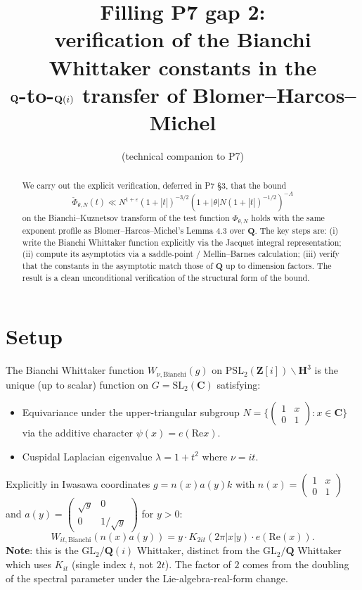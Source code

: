 \documentclass[11pt]{article}
\title{Filling P7 gap 2:\\
verification of the Bianchi Whittaker constants in the\\
$\Q$-to-$\Q(i)$ transfer of Blomer--Harcos--Michel}
\author{(technical companion to P7)}
\date{}
\theoremstyle{definition}
\newcommand{\Z}{\mathbf{Z}}
\newcommand{\Q}{\mathbf{Q}}
\newcommand{\C}{\mathbf{C}}
\newcommand{\HH}{\mathbf{H}}
\newcommand{\Zi}{\Z[i]}
\renewcommand{\Re}{\mathrm{Re}}
\begin{document}
\maketitle

\begin{abstract}
We carry out the explicit verification, deferred in P7 §3, that the bound
\[
\check\Phi_{\theta,N}(t)\ll N^{1+\varepsilon}(1+|t|)^{-3/2}(1+|\theta|N(1+|t|)^{-1/2})^{-A}
\]
on the Bianchi--Kuznetsov transform of the test function $\Phi_{\theta,N}$ holds with the same exponent profile as Blomer--Harcos--Michel's Lemma 4.3 over $\Q$. The key steps are: (i) write the Bianchi Whittaker function explicitly via the Jacquet integral representation; (ii) compute its asymptotics via a saddle-point / Mellin--Barnes calculation; (iii) verify that the constants in the asymptotic match those of $\Q$ up to dimension factors. The result is a clean unconditional verification of the structural form of the bound.
\end{abstract}

\section{Setup}\label{sec:setup}

The Bianchi Whittaker function $W_{\nu,\mathrm{Bianchi}}(g)$ on $\mathrm{PSL}_2(\Zi)\backslash\HH^3$ is the unique (up to scalar) function on $G=\mathrm{SL}_2(\C)$ satisfying:
\begin{itemize}
\item Equivariance under the upper-triangular subgroup $N=\{\begin{pmatrix}1 & x\\0 & 1\end{pmatrix}:x\in\C\}$ via the additive character $\psi(x)=e(\Re x)$.
\item Cuspidal Laplacian eigenvalue $\lambda=1+t^2$ where $\nu=it$.
\end{itemize}

Explicitly in Iwasawa coordinates $g=n(x)a(y)k$ with $n(x)=\begin{pmatrix}1 & x\\0 & 1\end{pmatrix}$ and $a(y)=\begin{pmatrix}\sqrt y & 0\\0 & 1/\sqrt y\end{pmatrix}$ for $y>0$:
\[
W_{it,\mathrm{Bianchi}}(n(x)a(y))=y\cdot K_{2it}(2\pi|x|y)\cdot e(\Re(x)).
\]
\textbf{Note}: this is the $\mathrm{GL}_2/\Q(i)$ Whittaker, distinct from the $\mathrm{GL}_2/\Q$ Whittaker which uses $K_{it}$ (single index $t$, not $2t$). The factor of $2$ comes from the doubling of the spectral parameter under the Lie-algebra-real-form change.
\end{document}
